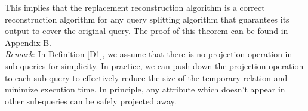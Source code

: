     This implies that the replacement reconstruction algorithm is a correct reconstruction algorithm for any query splitting algorithm that guarantees its output to cover the original query. The proof of this theorem can be found in Appendix B.\vspace{6pt}\\
    \textit{Remark}: In Definition \ref{D1}, we assume that there is no projection operation in sub-queries for simplicity. In practice, we can push down the projection operation to each sub-query to effectively reduce the size of the temporary relation and minimize execution time. In principle, any attribute which doesn't appear in other sub-queries can be safely projected away.